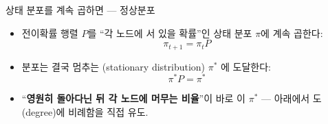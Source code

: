 \begin{frame}{상태 분포를 계속 곱하면 --- 정상분포}
  \begin{itemize}
    \item 전이확률 행렬 $P$를 ``각 노드에 서 있을 확률''인
      상태 분포 $\pi$에 계속 곱한다:
      \[ \pi_{t+1} = \pi_t P \]
    \item 분포는 결국 멈추는 (stationary distribution)
      $\pi^*$ 에 도달한다:
      \[ \pi^* P = \pi^* \]
    \item ``\textbf{영원히 돌아다닌 뒤 각 노드에 머무는 비율}''이
      바로 이 $\pi^*$ --- 아래에서 도(degree)에 비례함을 직접 유도.
  \end{itemize}
\end{frame}
